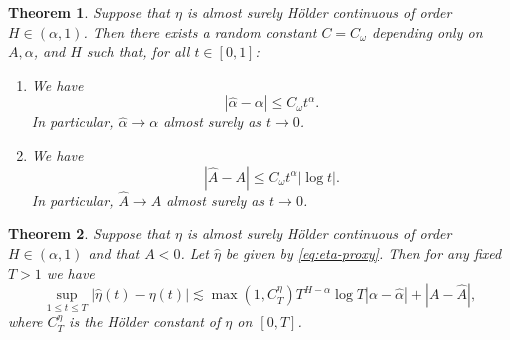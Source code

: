 \documentclass[10pt,a4paper]{amsart}
\newtheorem{thm}{Theorem}
\begin{document}
\begin{thm}\label{thm:a_alpha_consistency}
    Suppose that $\eta$ is almost surely H\"older continuous of order $H\in(\alpha,1)$. Then there exists a random constant $C=C_\omega$ depending only on $A,\alpha$, and $H$ such that, for all $t\in [0,1]$: 
    \begin{enumerate}
    \item We have \begin{equation}
    \label{eq:alpha-consistent}
    |\hat\alpha - \alpha|\leq C_\omega t^{\alpha}.
    \end{equation}
    In particular, $\hat\alpha \to \alpha$ almost surely as $t\to 0$. 
    \item We have
    \begin{equation}
    \label{eq:A-consistent}
    |\hat{A} -A| \leq C_\omega t^\alpha |\log t|.
    \end{equation}
    In particular, $\hat{A} \to A$ almost surely as  $t\to 0$.
    \end{enumerate}
\end{thm}

\begin{thm}
\label{thm:noise-error}
Suppose that $\eta$ is almost surely H\"older continuous of order $H\in(\alpha,1)$ and that $A<0$. Let $\hat\eta$ be given by \eqref{eq:eta-proxy}. Then for any fixed $T>1$ we have 
    $$
    \sup_{1\leq t\leq T}|\hat{\eta}(t) - \eta(t)| \lesssim \max(1,C^\eta_T)T^{H-\alpha}\log T |\alpha - \hat\alpha| + |A - \hat{A}|,
    $$
    where $C^\eta_T$ is the H\"older constant of $\eta$ on $[0,T]$.
\end{thm}
\end{document}
